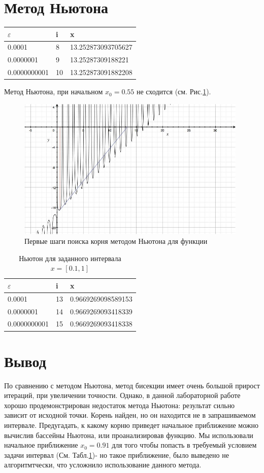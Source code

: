 \documentclass{article}
\begin{document}
\section{Метод Ньютона}
\begin{table}[!h]
\begin{tabular}{l|l|l}
	$\varepsilon$  	& i & x \\
	\hline
	0.0001 			& 8	& 13.252873093705627\\
	0.0000001		& 9	& 13.25287309188221\\
	0.0000000001	& 10& 13.252873091882208\\
\end{tabular}
\end{table}

Метод Ньютона, при начальном $x_{0} = 0.55$ не сходится (см. Рис.\ref{lab3_3}).
\begin{figure}[!h]
	\includegraphics[width=11cm]{lab3_3.png}
	\caption{Первые шаги поиска корня методом Ньютона для функции}
	\label{lab3_3}
\end{figure}


\begin{table}[!h]
\begin{tabular}{l|l|l}
	$\varepsilon$  	& i 	& x \\
	\hline
	0.0001 			& 13& 0.9669269098589153\\
	0.0000001		& 14& 0.9669269093418339\\
	0.0000000001	& 15& 0.9669269093418338\\
\end{tabular}
\caption{Ньютон для заданного интервала $x = [0.1, 1]$}
\label{adj_neuton}
\end{table}

\section{Вывод}
По сравнению с методом Ньютона, метод бисекции имеет очень большой прирост
итераций, при увеличении точности.
Однако, в данной лабораторной работе хорошо продемонстрирован недостаток метода
Ньютона: результат сильно зависит от исходной точки.
Корень найден, но он находится не в запрашиваемом интервале.
Предугадать, к какому корню приведет начальное приближение можно вычислив
бассейны Ньютона, или проанализировав функцию.
Мы использовали начальное приближение $x_{0} = 0.91$ для того чтобы попасть в
требуемый условием задачи интервал (См. Табл.\ref{adj_neuton})- но такое
приближение, было выведено не алгоритмтчески, что усложнило использование данного метода.
\end{document}
